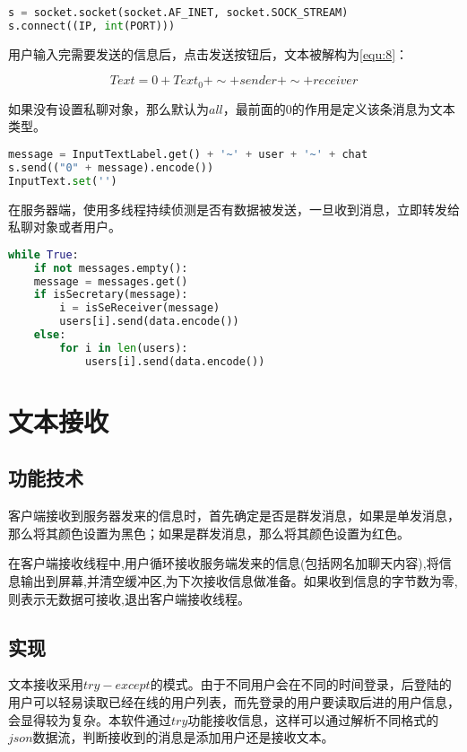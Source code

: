 \documentclass[forprint]{OSPaper}
\begin{document}
\begin{lstlisting}[language=Python]
s = socket.socket(socket.AF_INET, socket.SOCK_STREAM)
s.connect((IP, int(PORT)))
\end{lstlisting} 

用户输入完需要发送的信息后，点击发送按钮后，文本被解构为\ref{equ:8}：

\begin{equation}
	Text = 0+Text_{0}+\sim+sender+\sim+receiver
	\label{equ:8}
\end{equation}

如果没有设置私聊对象，那么默认为$all$，最前面的0的作用是定义该条消息为文本类型。

\begin{lstlisting}[language=Python]
message = InputTextLabel.get() + '~' + user + '~' + chat
s.send(("0" + message).encode())
InputText.set('')
\end{lstlisting} 

在服务器端，使用多线程持续侦测是否有数据被发送，一旦收到消息，立即转发给私聊对象或者用户。

\begin{lstlisting}[language=Python]
while True:
	if not messages.empty():
	message = messages.get()
	if isSecretary(message):
		i = isSeReceiver(message)
		users[i].send(data.encode())
	else:
		for i in len(users):
			users[i].send(data.encode())
\end{lstlisting} 

\section{文本接收}

\subsection{功能技术}

客户端接收到服务器发来的信息时，首先确定是否是群发消息，如果是单发消息，那么将其颜色设置为黑色；如果是群发消息，那么将其颜色设置为红色。

在客户端接收线程中,用户循环接收服务端发来的信息(包括网名加聊天内容),将信息输出到屏幕,并清空缓冲区,为下次接收信息做准备。如果收到信息的字节数为零,则表示无数据可接收,退出客户端接收线程。

\subsection{实现}

文本接收采用$try-except$的模式。由于不同用户会在不同的时间登录，后登陆的用户可以轻易读取已经在线的用户列表，而先登录的用户要读取后进的用户信息，会显得较为复杂。本软件通过$try$功能接收信息，这样可以通过解析不同格式的$json$数据流，判断接收到的消息是添加用户还是接收文本。
\end{document}
